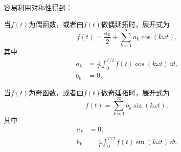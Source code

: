 容易利用对称性得到：
\begin{theorem}[偶函数的傅里叶展开]
    当$f(t)$为偶函数，或者由$f(t)$做偶延拓时，展开式为
    \begin{equation}
        f(t)=\frac{a_0}{2}+\sum_{k = 1}^{\infty} a_k\cos(k\omega t),
    \end{equation}
    其中
    \begin{align}
        a_k&=\frac{4}{T}\int_{0}^{T/2} f(t)\cos(k\omega t)\,\dd t,\\
        b_k&=0.
    \end{align}
\end{theorem}

\begin{theorem}[奇函数的傅里叶展开]
    当$f(t)$为奇函数，或者由$f(t)$做奇延拓时，展开式为
    \begin{equation}
        f(t)=\sum_{k = 1}^{\infty} b_k \sin(k\omega t),
    \end{equation}
    其中
    \begin{align}
        a_k&=0,\\
        b_k&=\frac{4}{T}\int_{0}^{T/2} f(t)\sin(k\omega t)\,\dd t.
    \end{align}
\end{theorem}

